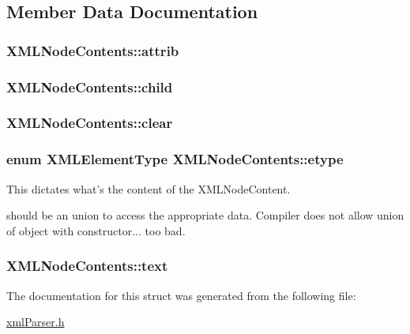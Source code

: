 \subsection{Member Data Documentation}
\hypertarget{structXMLNodeContents_a0fd3093b1eac5edcb67bec9cf40cdaac}{
\subsubsection[{attrib}]{ X\-M\-L\-Node\-Contents\-::attrib}}\label{structXMLNodeContents_a0fd3093b1eac5edcb67bec9cf40cdaac}
\hypertarget{structXMLNodeContents_a07bfee26b5b5c9e15adcb172f3b7f846}{
\subsubsection[{child}]{ X\-M\-L\-Node\-Contents\-::child}}\label{structXMLNodeContents_a07bfee26b5b5c9e15adcb172f3b7f846}
\hypertarget{structXMLNodeContents_a08ef8b489dd008060a1ff28269c6730e}{
\subsubsection[{clear}]{ X\-M\-L\-Node\-Contents\-::clear}}\label{structXMLNodeContents_a08ef8b489dd008060a1ff28269c6730e}
\hypertarget{structXMLNodeContents_a3cc71f0b9fc7b75133de379f1e5d7a2b}{
\subsubsection[{etype}]{\setlength{\rightskip}{0pt plus 5cm}enum {\bf X\-M\-L\-Element\-Type} X\-M\-L\-Node\-Contents\-::etype}}\label{structXMLNodeContents_a3cc71f0b9fc7b75133de379f1e5d7a2b}


This dictates what's the content of the X\-M\-L\-Node\-Content. 

should be an union to access the appropriate data. Compiler does not allow union of object with constructor... too bad. \hypertarget{structXMLNodeContents_a9e3eda44aa3b88d61cbfbe8d5b055c51}{
\subsubsection[{text}]{ X\-M\-L\-Node\-Contents\-::text}}\label{structXMLNodeContents_a9e3eda44aa3b88d61cbfbe8d5b055c51}


The documentation for this struct was generated from the following file\-:\begin{DoxyCompactItemize}
\item 
\hyperlink{xmlParser_8h}{xml\-Parser.\-h}\end{DoxyCompactItemize}
